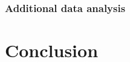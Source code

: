 \documentclass{beamer}
\begin{document}






\begin{frame}
	\frametitle{Additional data analysis}
	\label{sec:features}
	
\end{frame}


\section{Conclusion}

\begin{frame}
	
\end{frame}



\printbibliography
\end{document}
